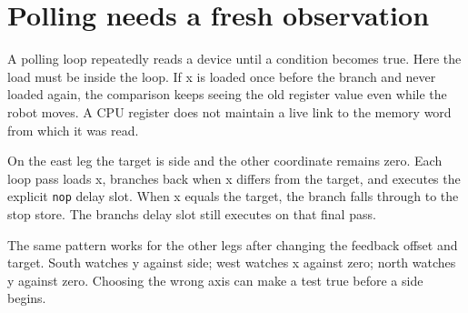 \section{Polling needs a fresh
  observation}\label{006-marsbot-square-p05-polling-needs-a-fresh-observation}

A polling loop repeatedly reads a device until a condition becomes true.
Here the load must be inside the loop. If x is loaded once before the
branch and never loaded again, the comparison keeps seeing the old
register value even while the robot moves. A CPU register does not
maintain a live link to the memory word from which it was read.

On the east leg the target is side and the other coordinate remains
zero. Each loop pass loads x, branches back when x differs from the
target, and executes the explicit \texttt{nop} delay slot. When x equals
the target, the branch falls through to the stop store. The
branch\textquotesingle s delay slot still executes on that final pass.

The same pattern works for the other legs after changing the feedback
offset and target. South watches y against side; west watches x against
zero; north watches y against zero. Choosing the wrong axis can make a
test true before a side begins.
